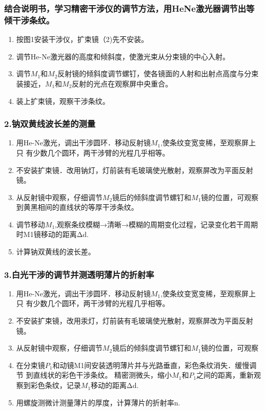 \documentclass[12pt,a4paper,UTF8]{ctexart}
\begin{document}
\subsubsection*{结合说明书，学习精密干涉仪的调节方法，用HeNe激光器调节出等倾干涉条纹。}
    \begin{enumerate}
		\item 按图1安装干涉仪，扩束镜（2)先不安装。
		\item 调节He-Ne激光器的高度和倾斜度，使激光束从分束镜的中心入射。
		\item 调节$M_1$和$M_2$反射镜的倾斜度调节螺钉，使各镜面的人射和出射点高度与分束
		装接近，$M_1$和$M_2$反射的光点在观察屏中央重合。
		\item 装上扩束镜，观察干涉条纹。 
	\end{enumerate}

\subsubsection*{2.钠双黄线波长差的测量}
    \begin{enumerate}
		\item 用He-Ne激光，调出干涉圆环．移动反射镜$M_1$,使条纹变宽变稀，至观察屏上只
		有少数几个圆环，两干涉臂的光程几乎相等。
		\item 不安装扩束镜．改用钠灯，灯前装有毛玻璃使光散射，观察屏改为平面反射镜。
		\item 从反射镜中观察，仔细调节$M_2$镜后的倾斜度调节螺钉和$M_1$镜的位置，可观察
		到黄黑相间的直线状的等厚干涉条纹。
		\item 调节移动$M_1$,观察条纹模糊→清晰→模糊的周期变化过程，记录变化若干周期
		时M1镜移动的距离Δd.
		\item 计算钠双黄线的波长差。
	\end{enumerate}

\subsubsection*{3.白光干涉的调节并测透明薄片的折射率}
    \begin{enumerate}
		\item 用He-Ne激光，调出干涉圆环．移动反射镜$M_1$,使条纹变宽变稀，至观察屏上只
		有少数几个圆环，两干涉臂的光程几乎相等。
		\item 不安装扩束镜，改用汞灯，灯前装有毛玻璃使光散射，观察屏改为平面反射镜。
		\item 从反射镜中观察，仔细调节$M_2$镜后的倾斜度调节螺钉和$M_1$镜的位置，可观察
		\item 在分束镜$P_1$和动镜M1间安装透明薄片并与光路垂直，彩色条纹消失．缓慢调节
		到直线状的彩色干涉条纹。
		精密测微头，缩小$M_1$和$P_1$之间的距离，重新观察到彩色条纹，记录$M_1$移动的距离Δd.
		\item 用螺旋测微计测量薄片的厚度，计算薄片的折射率n.
	\end{enumerate}
\end{document}
